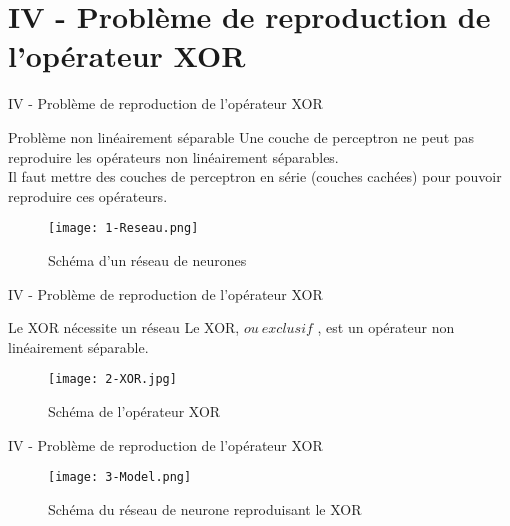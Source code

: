 
\section{IV - Problème de reproduction de l'opérateur XOR}
\begin{frame}{IV - Problème de reproduction de l'opérateur XOR}
	\begin{block}{Problème non linéairement séparable}
		Une couche de perceptron ne peut pas reproduire les opérateurs non linéairement séparables. \\
		Il faut mettre des couches de perceptron en série (couches cachées) pour pouvoir reproduire ces opérateurs. \\
	\end{block}
	\begin{figure}
		\centering
		\texttt{[image: 1-Reseau.png]}
		\caption{Schéma d'un réseau de neurones}
	\end{figure}
\end{frame}


\begin{frame}{IV - Problème de reproduction de l'opérateur XOR}
	\begin{block}{Le XOR nécessite un réseau}
		Le XOR, \og $ou\ exclusif$ \fg, est un opérateur non linéairement séparable. \\
	\end{block}
	\begin{figure}
		\centering
		\texttt{[image: 2-XOR.jpg]}
		\caption{Schéma de l'opérateur XOR}
	\end{figure}
\end{frame}


\begin{frame}{IV - Problème de reproduction de l'opérateur XOR}
	\begin{figure}
		\centering
		\texttt{[image: 3-Model.png]}
		\caption{Schéma du réseau de neurone reproduisant le XOR}
	\end{figure}
\end{frame}



